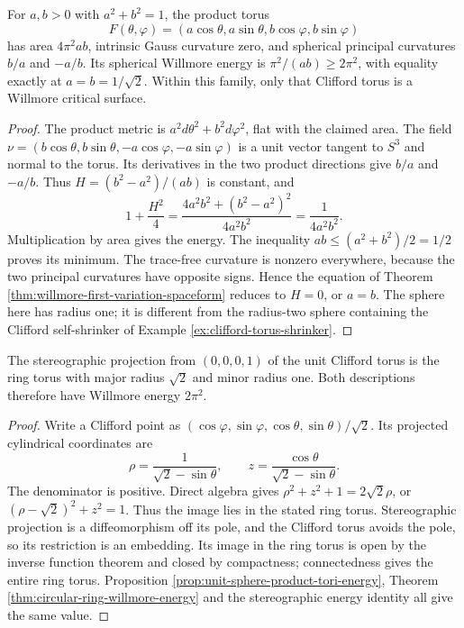 \begin{proposition}\label{prop:unit-sphere-product-tori-energy}
For $a,b>0$ with $a^2+b^2=1$, the product torus
\[
 F(\theta,\varphi)=(a\cos\theta,a\sin\theta,b\cos\varphi,b\sin\varphi)
\]
has area $4\pi^2ab$, intrinsic Gauss curvature zero, and spherical principal curvatures $b/a$ and $-a/b$. Its spherical Willmore energy is $\pi^2/(ab)\geq2\pi^2$, with equality exactly at $a=b=1/\sqrt2$. Within this family, only that Clifford torus is a Willmore critical surface.
\end{proposition}
\begin{proof}
The product metric is $a^2d\theta^2+b^2d\varphi^2$, flat with the claimed area. The field
$\nu=(b\cos\theta,b\sin\theta,-a\cos\varphi,-a\sin\varphi)$
is a unit vector tangent to $S^3$ and normal to the torus. Its derivatives in the two product directions give $b/a$ and $-a/b$. Thus $H=(b^2-a^2)/(ab)$ is constant, and
\[
 1+\frac{H^2}{4}=\frac{4a^2b^2+(b^2-a^2)^2}{4a^2b^2}
 =\frac1{4a^2b^2}.
\]
Multiplication by area gives the energy. The inequality $ab\leq(a^2+b^2)/2=1/2$ proves its minimum. The trace-free curvature is nonzero everywhere, because the two principal curvatures have opposite signs. Hence the equation of Theorem \ref{thm:willmore-first-variation-spaceform} reduces to $H=0$, or $a=b$. The sphere here has radius one; it is different from the radius-two sphere containing the Clifford self-shrinker of Example \ref{ex:clifford-torus-shrinker}.
\end{proof}

\begin{example}\label{ex:clifford-stereographic-ring}
The stereographic projection from $(0,0,0,1)$ of the unit Clifford torus is the ring torus with major radius $\sqrt2$ and minor radius one. Both descriptions therefore have Willmore energy $2\pi^2$.
\end{example}
\begin{proof}
Write a Clifford point as $(\cos\varphi,\sin\varphi,\cos\theta,\sin\theta)/\sqrt2$. Its projected cylindrical coordinates are
\[
 \rho=\frac1{\sqrt2-\sin\theta},\qquad
 z=\frac{\cos\theta}{\sqrt2-\sin\theta}.
\]
The denominator is positive. Direct algebra gives $\rho^2+z^2+1=2\sqrt2\rho$, or $(\rho-\sqrt2)^2+z^2=1$. Thus the image lies in the stated ring torus. Stereographic projection is a diffeomorphism off its pole, and the Clifford torus avoids the pole, so its restriction is an embedding. Its image in the ring torus is open by the inverse function theorem and closed by compactness; connectedness gives the entire ring torus. Proposition \ref{prop:unit-sphere-product-tori-energy}, Theorem \ref{thm:circular-ring-willmore-energy} and the stereographic energy identity all give the same value.
\end{proof}

